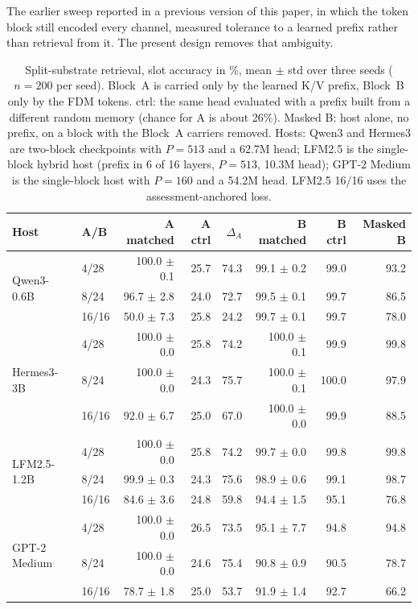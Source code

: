 The earlier sweep reported in a previous version of this paper, in which the token block still encoded every
channel, measured tolerance to a learned prefix rather than retrieval from it. The present design removes
that ambiguity.

\begin{table}[t]
\centering
\caption{Split-substrate retrieval, slot accuracy in \%, mean $\pm$ std over three seeds ($n{=}200$ per
seed). Block~A is carried only by the learned K/V prefix, Block~B only by the FDM tokens. ctrl: the same
head evaluated with a prefix built from a different random memory (chance for A is about 26\%). Masked B:
host alone, no prefix, on a block with the Block~A carriers removed. Hosts: Qwen3 and Hermes3 are
two-block checkpoints with $P{=}513$ and a 62.7M head; LFM2.5 is the single-block hybrid host (prefix in
6 of 16 layers, $P{=}513$, 10.3M head); GPT-2 Medium is the single-block host with $P{=}160$ and a
54.2M head. LFM2.5 16/16 uses the assessment-anchored loss.}
\label{tab:split_substrate}
\small
\begin{tabular}{llrrrrrr}
\toprule
Host & A/B & A matched & A ctrl & $\Delta_A$ & B matched & B ctrl & Masked B \\
\midrule
\multirow{3}{*}{Qwen3-0.6B}
 & 4/28  & 100.0 $\pm$ 0.1 & 25.7 & 74.3 & 99.1 $\pm$ 0.2 & 99.0 & 93.2 \\
 & 8/24  &  96.7 $\pm$ 2.8 & 24.0 & 72.7 & 99.5 $\pm$ 0.1 & 99.7 & 86.5 \\
 & 16/16 &  50.0 $\pm$ 7.3 & 25.8 & 24.2 & 99.7 $\pm$ 0.1 & 99.7 & 78.0 \\
\midrule
\multirow{3}{*}{Hermes3-3B}
 & 4/28  & 100.0 $\pm$ 0.0 & 25.8 & 74.2 & 100.0 $\pm$ 0.1 &  99.9 & 99.8 \\
 & 8/24  & 100.0 $\pm$ 0.0 & 24.3 & 75.7 & 100.0 $\pm$ 0.1 & 100.0 & 97.9 \\
 & 16/16 &  92.0 $\pm$ 6.7 & 25.0 & 67.0 & 100.0 $\pm$ 0.0 &  99.9 & 88.5 \\
\midrule
\multirow{3}{*}{LFM2.5-1.2B}
 & 4/28  & 100.0 $\pm$ 0.0 & 25.8 & 74.2 & 99.7 $\pm$ 0.0 & 99.8 & 99.8 \\
 & 8/24  &  99.9 $\pm$ 0.3 & 24.3 & 75.6 & 98.9 $\pm$ 0.6 & 99.1 & 98.7 \\
 & 16/16 &  84.6 $\pm$ 3.6 & 24.8 & 59.8 & 94.4 $\pm$ 1.5 & 95.1 & 76.8 \\
\midrule
\multirow{3}{*}{GPT-2 Medium}
 & 4/28  & 100.0 $\pm$ 0.0 & 26.5 & 73.5 & 95.1 $\pm$ 7.7 & 94.8 & 94.8 \\
 & 8/24  & 100.0 $\pm$ 0.0 & 24.6 & 75.4 & 90.8 $\pm$ 0.9 & 90.5 & 78.7 \\
 & 16/16 &  78.7 $\pm$ 1.8 & 25.0 & 53.7 & 91.9 $\pm$ 1.4 & 92.7 & 66.2 \\
\bottomrule
\end{tabular}
\end{table}

